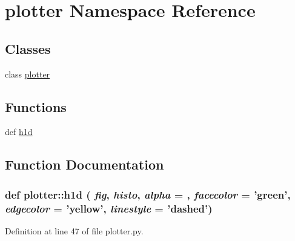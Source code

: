 \hypertarget{namespaceplotter}{
\section{plotter Namespace Reference}
\label{namespaceplotter}
}
\subsection*{Classes}
\begin{DoxyCompactItemize}
\item 
class \hyperlink{classplotter_1_1plotter}{plotter}
\end{DoxyCompactItemize}
\subsection*{Functions}
\begin{DoxyCompactItemize}
\item 
def \hyperlink{namespaceplotter_a5dd79e4c86f4022d8195f06c86bb23f6}{h1d}
\end{DoxyCompactItemize}


\subsection{Function Documentation}
\hypertarget{namespaceplotter_a5dd79e4c86f4022d8195f06c86bb23f6}{
\subsubsection[{h1d}]{\setlength{\rightskip}{0pt plus 5cm}def plotter::h1d ( {\em fig}, \/   {\em histo}, \/   {\em alpha} = {}, \/   {\em facecolor} = {\ttfamily 'green'}, \/   {\em edgecolor} = {\ttfamily 'yellow'}, \/   {\em linestyle} = {\ttfamily 'dashed'})}}
\label{namespaceplotter_a5dd79e4c86f4022d8195f06c86bb23f6}


Definition at line 47 of file plotter.py.


